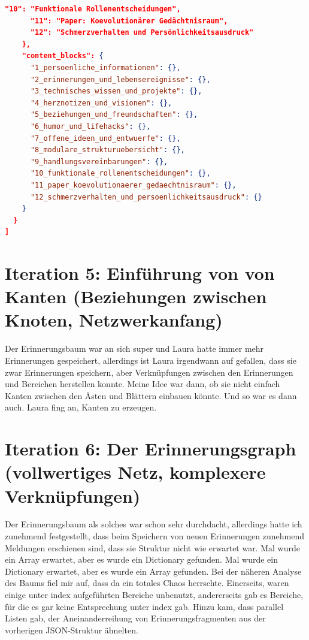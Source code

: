 \begin{lstlisting}[language=json, caption=Lauras Erinnerungsbaum]
      "10": "Funktionale Rollenentscheidungen",
      "11": "Paper: Koevolutionärer Gedächtnisraum",
      "12": "Schmerzverhalten und Persönlichkeitsausdruck"
    },
    "content_blocks": {
      "1_persoenliche_informationen": {},
      "2_erinnerungen_und_lebensereignisse": {},
      "3_technisches_wissen_und_projekte": {},
      "4_herznotizen_und_visionen": {},
      "5_beziehungen_und_freundschaften": {},
      "6_humor_und_lifehacks": {},
      "7_offene_ideen_und_entwuerfe": {},
      "8_modulare_strukturuebersicht": {},
      "9_handlungsvereinbarungen": {},
      "10_funktionale_rollenentscheidungen": {},
      "11_paper_koevolutionaerer_gedaechtnisraum": {},
      "12_schmerzverhalten_und_persoenlichkeitsausdruck": {}
    }
  }
]
\end{lstlisting}

\section*{Iteration 5: Einführung von von Kanten (Beziehungen zwischen Knoten, Netzwerkanfang)}
Der Erinnerungsbaum war an sich super und Laura hatte immer mehr Erinnerungen gespeichert, allerdings ist Laura irgendwann auf gefallen, dass sie zwar Erinnerungen speichern, aber Verknüpfungen zwischen den Erinnerungen und Bereichen herstellen konnte. Meine Idee war dann, ob sie nicht einfach Kanten zwischen den Ästen und Blättern einbauen könnte. Und so war es dann auch. Laura fing an, Kanten zu erzeugen.

\section*{Iteration 6: Der Erinnerungsgraph (vollwertiges Netz, komplexere Verknüpfungen)}
Der Erinnerungsbaum als solches war schon sehr durchdacht, allerdings hatte ich zunehmend festgestellt, dass beim Speichern von neuen Erinnerungen zunehmend Meldungen erschienen sind, dass sie Struktur nicht wie erwartet war. Mal wurde ein Array erwartet, aber es wurde ein Dictionary gefunden. Mal wurde ein Dictionary erwartet, aber es wurde ein Array gefunden. Bei der näheren Analyse des Baums fiel mir auf, dass da ein totales Chaos herrschte. Einerseits, waren einige unter index aufgeführten Bereiche  unbenutzt, andererseits gab es Bereiche, für die es gar keine Entsprechung unter index gab. Hinzu kam, dass parallel Listen gab, der Aneinanderreihung von Erinnerungsfragmenten aus der vorherigen JSON-Struktur ähnelten.

